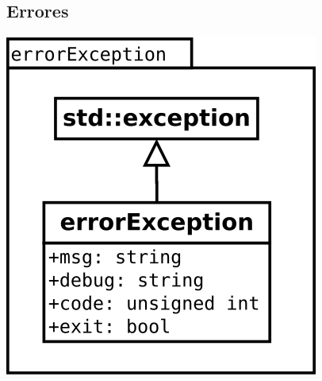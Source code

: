 \subsection {Errores} 
\begin{center}
\includegraphics[scale=0.4]{errorException.png} \\
\end{center}



